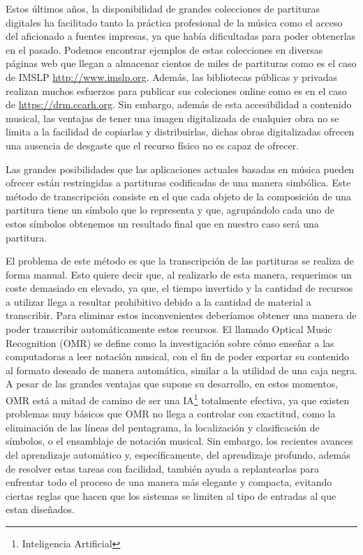 \documentclass{article}
\begin{document}
Estos últimos años, la disponibilidad de grandes colecciones de partituras digitales ha facilitado tanto la práctica
profesional de la música como el acceso del aficionado a fuentes impresas, ya que había dificultadas para poder obtenerlas
en el pasado. Podemos encontrar ejemplos de estas colecciones en diversas páginas web que llegan a almacenar cientos de
miles de partituras como es el caso de IMSLP \url{http://www.imslp.org}. Además, las bibliotecas públicas y privadas
realizan muchos esfuerzos para publicar sus coleciones online como es en el caso de \url{https://drm.ccarh.org}. Sin
embargo, además de esta accesibilidad a contenido musical, las ventajas de tener una imagen digitalizada de cualquier
obra no se limita a la facilidad de copiarlas y distribuirlas, dichas obras  digitalizadas ofrecen una ausencia de
desgaste que el recurso físico no es capaz de ofrecer.

Las grandes posibilidades que las aplicaciones actuales basadas en música pueden ofrecer están restringidas a partituras codificadas
 de una manera simbólica. Este método de transcripción consiste en el que cada objeto de la composición de una partitura
tiene un símbolo que lo representa y que, agrupándolo cada uno de estos símbolos obtenemos un resultado final que en nuestro
caso será una partitura.

El problema de este método es que la transcripción de las partituras se realiza de forma manual. Esto quiere decir que,
al realizarlo de esta manera, requerimos un coste demasiado en elevado, ya que, el tiempo invertido y la cantidad de recursos
a utilizar llega a resultar prohibitivo debido a la cantidad de material a transcribir. Para eliminar estos inconvenientes
deberíamos obtener una manera de poder transcribir automáticamente estos recursos. El llamado Optical Music Recognition
(OMR) se define como la investigación sobre cómo enseñar a las computadoras a leer notación musical, con el fin de poder
exportar su contenido al formato deseado de manera automática, similar a la utilidad de una caja negra. A pesar de las
grandes ventajas que supone su desarrollo, en estos momentos, OMR está a mitad de camino de ser una IA\footnote{Inteligencia Artificial}
totalmente efectiva, ya que existen problemas muy básicos que OMR no llega a controlar con exactitud, como la eliminación de
las líneas del pentagrama, la localización y clasificación de símbolos, o el ensamblaje de notación musical. Sin embargo, los recientes
avances del aprendizaje automático y, específicamente, del aprendizaje profundo, además de resolver estas tareas con facilidad,
también ayuda a replantearlas para enfrentar todo el proceso de una manera más elegante y compacta, evitando ciertas reglas que hacen que los
sistemas se limiten al tipo de entradas al que estan diseñados.
\end{document}
